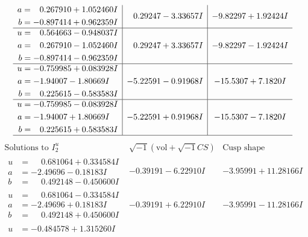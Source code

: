 \documentclass[1p]{elsarticle_modified}
\theoremstyle{definition}
\newcommand{\I}{\sqrt{-1}}
\begin{document}
$$\begin{array}{c|c|c}
\begin{aligned}
a &= \phantom{-}0.267910 + 1.052460 I \\
b &= -0.897414 + 0.962359 I\end{aligned}
 & \phantom{-}0.29247 - 3.33657 I & -9.82297 + 1.92424 I \\ \hline\begin{aligned}
u &= \phantom{-}0.564663 - 0.948037 I \\
a &= \phantom{-}0.267910 - 1.052460 I \\
b &= -0.897414 - 0.962359 I\end{aligned}
 & \phantom{-}0.29247 + 3.33657 I & -9.82297 - 1.92424 I \\ \hline\begin{aligned}
u &= -0.759985 + 0.083928 I \\
a &= -1.94007 - 1.80669 I \\
b &= \phantom{-}0.225615 - 0.583583 I\end{aligned}
 & -5.22591 - 0.91968 I & -15.5307 + 7.1820 I \\ \hline\begin{aligned}
u &= -0.759985 - 0.083928 I \\
a &= -1.94007 + 1.80669 I \\
b &= \phantom{-}0.225615 + 0.583583 I\end{aligned}
 & -5.22591 + 0.91968 I & -15.5307 - 7.1820 I\\
 \hline 
 \end{array}$$\newpage$$\begin{array}{c|c|c}  
\text{Solutions to }I^u_{2}& \I (\text{vol} + \sqrt{-1}CS) & \text{Cusp shape}\\
 \hline 
\begin{aligned}
u &= \phantom{-}0.681064 + 0.334584 I \\
a &= -2.49696 - 0.18183 I \\
b &= \phantom{-}0.492148 - 0.450600 I\end{aligned}
 & -0.39191 - 6.22910 I & -3.95991 + 11.28166 I \\ \hline\begin{aligned}
u &= \phantom{-}0.681064 - 0.334584 I \\
a &= -2.49696 + 0.18183 I \\
b &= \phantom{-}0.492148 + 0.450600 I\end{aligned}
 & -0.39191 + 6.22910 I & -3.95991 - 11.28166 I \\ \hline\begin{aligned}
u &= -0.484578 + 1.315260 I \\

\end{aligned}
\end{array}$$
\end{document}
